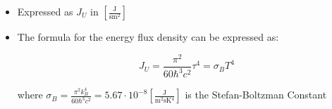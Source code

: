 \begin{itemize}
\begin{itemize}
        \item Expressed as $J_U$ in $\left[ \frac{\si{\joule}}{\si{\second\meter\squared}} \right]$

        \item The formula for the energy flux density can be expressed as:

          $$J_U=\frac{\pi^2}{60\hbar^3c^2}\tau^4=\sigma_BT^4$$

          where $\sigma_B=\frac{\pi^2k_B^4}{60\hbar^3c^2}=5.67\cdot10^{-8}\left[ \frac{\si{\joule}}{\si{\meter\squared\second\kelvin^4}} \right]$ is the Stefan-Boltzman Constant

      \end{itemize}

\end{itemize}





